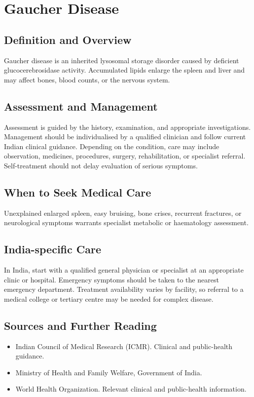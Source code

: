 \chapter{Gaucher Disease}

\section*{Definition and Overview}
Gaucher disease is an inherited lysosomal storage disorder caused by deficient glucocerebrosidase activity. Accumulated lipids enlarge the spleen and liver and may affect bones, blood counts, or the nervous system.

\section*{Assessment and Management}
Assessment is guided by the history, examination, and appropriate investigations. Management should be individualised by a qualified clinician and follow current Indian clinical guidance. Depending on the condition, care may include observation, medicines, procedures, surgery, rehabilitation, or specialist referral. Self-treatment should not delay evaluation of serious symptoms.

\section*{When to Seek Medical Care}
Unexplained enlarged spleen, easy bruising, bone crises, recurrent fractures, or neurological symptoms warrants specialist metabolic or haematology assessment.

\section*{India-specific Care}
In India, start with a qualified general physician or specialist at an appropriate clinic or hospital. Emergency symptoms should be taken to the nearest emergency department. Treatment availability varies by facility, so referral to a medical college or tertiary centre may be needed for complex disease.

\section*{Sources and Further Reading}
\begin{itemize}
    \item Indian Council of Medical Research (ICMR). Clinical and public-health guidance.
    \item Ministry of Health and Family Welfare, Government of India.
    \item World Health Organization. Relevant clinical and public-health information.
\end{itemize}

